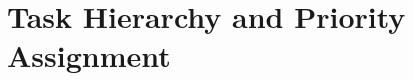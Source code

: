 \section{Task Hierarchy and Priority Assignment}
\label{sec:task-hierarchy}


\lipsum[24]

\begin{criticalinsight}
\end{criticalinsight}